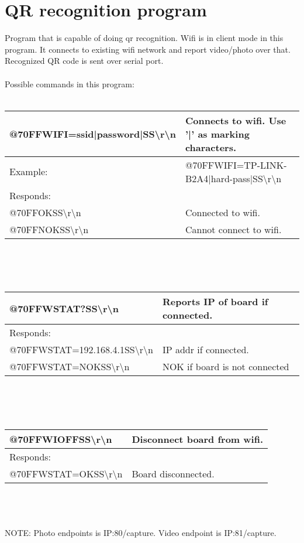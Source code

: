 \documentclass[a4paper,12pt]{article}
\begin{document}
\section{QR recognition program}
Program that is capable of doing qr recognition. Wifi is in client mode in this program. It connects to existing wifi network and report video/photo over that. Recognized QR code is sent over serial port. \\
\\
Possible commands in this program: \\
\\
\begin{tabular}{|l|l|}
\hline
 @70FFWIFI=ssid|password|SS\textbackslash r\textbackslash n & Connects to wifi. Use '|' as marking characters. \\
\hline
 Example: & @70FFWIFI=TP-LINK-B2A4|hard-pass|SS\textbackslash r\textbackslash n \\
\hline
 Responds: &\\ 
 @70FFOKSS\textbackslash r\textbackslash n & Connected to wifi. \\
 @70FFNOKSS\textbackslash r\textbackslash n & Cannot connect to wifi. \\
\hline
\end{tabular} \\ \\
\\
\begin{tabular}{|l|l|}
\hline
 @70FFWSTAT?SS\textbackslash r\textbackslash n & Reports IP of board if connected. \\
\hline
 Responds: &\\ 
 @70FFWSTAT=192.168.4.1SS\textbackslash r\textbackslash n & IP addr if connected. \\
 @70FFWSTAT=NOKSS\textbackslash r\textbackslash n & NOK if board is not connected \\
\hline
\end{tabular} \\ \\
\\
\begin{tabular}{|l|l|}
\hline
 @70FFWIOFFSS\textbackslash r\textbackslash n & Disconnect board from wifi. \\
\hline
 Responds: &\\ 
 @70FFWSTAT=OKSS\textbackslash r\textbackslash n & Board disconnected. \\
\hline
\end{tabular} \\ \\
\\
NOTE: Photo endpoints is IP:80/capture. Video endpoint is IP:81/capture.
\\
\end{document}
